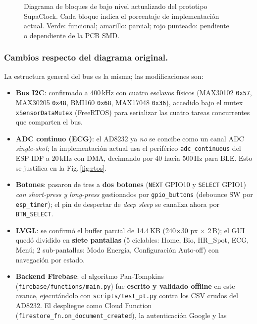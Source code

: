 \documentclass[letterpaper,11pt]{article}
\newcommand{\rfigura}[1]{Fig.\,\ref{#1}}
\begin{document}
\begin{figure}[H]
    \centering
    \resizebox{\textwidth}{!}{}
    \caption{Diagrama de bloques de bajo nivel actualizado del prototipo SupaClock. Cada bloque
    indica el porcentaje de implementación actual. Verde: funcional;
    amarillo: parcial; rojo punteado: pendiente o dependiente de la PCB SMD.}
    \label{fig:lownivel}
\end{figure}

\subsubsection{Cambios respecto del diagrama original.} La estructura general del bus es la misma;
las modificaciones son:
\begin{itemize}
    \item \textbf{Bus I2C}: confirmado a 400\,kHz con cuatro esclavos físicos
    (MAX30102 \texttt{0x57}, MAX30205 \texttt{0x48}, BMI160 \texttt{0x68}, MAX17048 \texttt{0x36}),
    accedido bajo el mutex \texttt{xSensorDataMutex} (FreeRTOS) para serializar las cuatro tareas
    concurrentes que comparten el bus.
    \item \textbf{ADC continuo (ECG)}: el AD8232 ya \textit{no} se concibe como un canal ADC
    \textit{single-shot}; la implementación actual usa el periférico \texttt{adc\_continuous}
    del ESP-IDF a 20\,kHz con DMA, decimando por 40 hacia 500\,Hz para BLE. Esto se justifica en
    la \rfigura{fig:rtos}.
    \item \textbf{Botones}: pasaron de tres a \textbf{dos botones} (\texttt{NEXT} GPIO10 y
    \texttt{SELECT} GPIO1) \textit{con short-press y long-press} gestionados por
    \texttt{gpio\_buttons} (debounce SW por \texttt{esp\_timer}); el pin de despertar de
    \textit{deep sleep} se canaliza ahora por \texttt{BTN\_SELECT}.
    \item \textbf{LVGL}: se confirmó el buffer parcial de 14.4\,KB (240$\times$30 px $\times$ 2\,B);
    el GUI quedó dividido en \textbf{siete pantallas} (5 ciclables: Home, Bio, HR\_Spot, ECG, Menú;
    2 sub-pantallas: Modo Energía, Configuración Auto-off) con navegación por estado.
    \item \textbf{Backend Firebase}: el algoritmo Pan-Tompkins (\texttt{firebase/functions/main.py})
    fue \textbf{escrito y validado offline} en este avance, ejecutándolo con
    \texttt{scripts/test\_pt.py} contra los CSV crudos del AD8232. El despliegue como Cloud
    Function (\texttt{firestore\_fn.on\_document\_created}), la autenticación Google y las

\end{itemize}
\end{document}
